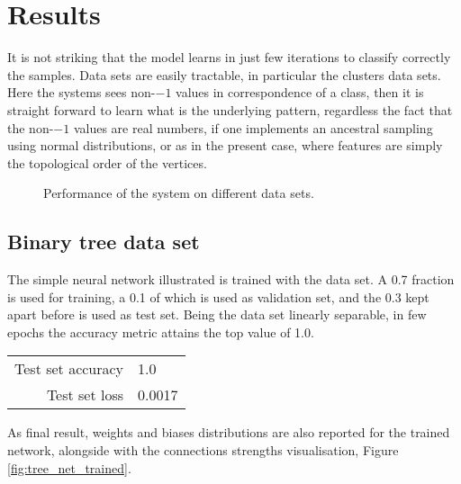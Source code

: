 \documentclass[a4paper,12pt]{article}
\begin{document}
\section{Results}

It is not striking that the model learns in just few iterations to classify correctly the samples. Data sets are easily tractable, in particular the clusters data sets. Here the systems sees non-$-1$ values in correspondence of a class, then it is straight forward to learn what is the underlying pattern, regardless the fact that the non-$-1$ values are real numbers, if one implements an ancestral sampling using normal distributions, or as in the present case, where features are simply the topological order of the vertices.

\begin{figure}[t!]
	\centering
	\par\medskip
	\caption{Performance of the system on different data sets.}
	\label{fig:nn_perf}
\end{figure}


\subsection{Binary tree data set}

The simple neural network illustrated is trained with the data set. A 0.7 fraction is used for training, a 0.1 of which is used as validation set, and the 0.3 kept apart before is used as test set. Being the data set linearly separable, in few epochs the accuracy metric attains the top value of 1.0.

\begin{table}[h!]
	\begin{center}
		\begin{tabular}{r l}
			Test set accuracy     & 1.0 \\
			Test set loss         & 0.0017
		\end{tabular}
	\end{center}
\end{table}

As final result, weights and biases distributions are also reported for the trained network, alongside with the connections strengths visualisation, Figure \ref{fig:tree_net_trained}.
\end{document}
